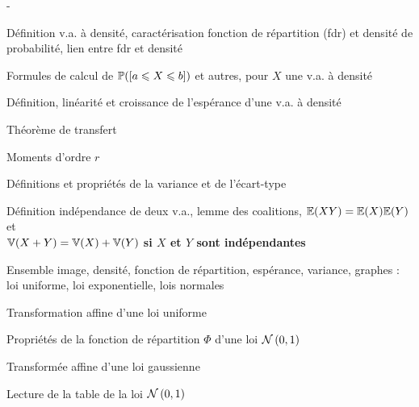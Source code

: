 \documentclass[11pt]{article}%
\begin{document}
\begin{noliste}{-}
 \item Définition v.a. à densité, caractérisation fonction de 
  répartition (fdr) et densité de probabilité, lien entre fdr et densité
  \item Formules de calcul de $\mathbb{P}(\left[ {a\leqslant X\leqslant b} \right])$ et autres, 
  pour $X$ une v.a. à densité
  \item Définition, linéarité et croissance de l'espérance d'une v.a. à 
  densité
  \item Théorème de transfert
  \item Moments d'ordre $r$
  \item Définitions et propriétés de la variance et de l'écart-type
  \item Définition indépendance de deux v.a., lemme des coalitions, 
  $\mathbb{E}(XY)=\mathbb{E}(X)\mathbb{E}(Y)$ et\\ $\mathbb{V}(X+Y)=\mathbb{V}(X)+\mathbb{V}(Y)$ {\bf si $X$ et $Y$ 
  sont indépendantes}
  \item Ensemble image, densité, fonction de répartition, espérance, variance, 
  graphes : loi uniforme, loi exponentielle, lois normales
  \item Transformation affine d'une loi uniforme
  \item Propriétés de la fonction de répartition $\Phi$ d'une loi
  $\mathcal{N}\left(0, 1\right)$
  \item Transformée affine d'une loi gaussienne
  \item Lecture de la table de la loi $\mathcal{N}\left(0, 1\right)$
\end{noliste}
\end{document}
